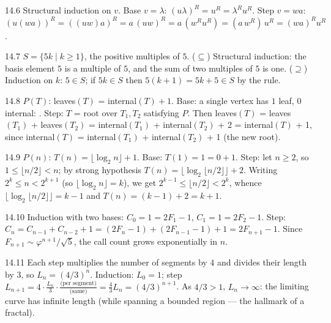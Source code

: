 \begin{solution}{14.6}
Structural induction on $v$. Base $v = \lambda$:
$(u\lambda)^R = u^R = \lambda^R u^R$. Step $v = wa$:
$(u(wa))^R = ((uw)a)^R = a\,(uw)^R = a\,(w^R u^R)
= (a\,w^R)\,u^R = (wa)^R u^R$.
\end{solution}

\begin{solution}{14.7}
$S = \{5k \mid k \geq 1\}$, the positive multiples of $5$. ($\subseteq$)
Structural induction: the basis element $5$ is a multiple of $5$, and the
sum of two multiples of $5$ is one. ($\supseteq$) Induction on $k$:
$5 \in S$; if $5k \in S$ then $5(k+1) = 5k + 5 \in S$ by the rule.
\end{solution}

\begin{solution}{14.8}
$P(T)$: leaves$(T)$ = internal$(T) + 1$. Base: a single vertex has $1$ leaf,
$0$ internal: \checkmark. Step: $T$ = root over $T_1, T_2$ satisfying $P$.
Then leaves$(T)$ = leaves$(T_1)$ + leaves$(T_2)$ =
internal$(T_1)$ + internal$(T_2)$ + 2 = internal$(T)$ + 1, since
internal$(T)$ = internal$(T_1)$ + internal$(T_2)$ + 1 (the new root).
\end{solution}

\begin{solution}{14.9}
$P(n)$: $T(n) = \lfloor \log_2 n \rfloor + 1$. Base: $T(1) = 1 = 0 + 1$.
Step: let $n \geq 2$, so $1 \le \lfloor n/2 \rfloor < n$; by strong
hypothesis $T(n) = \lfloor \log_2 \lfloor n/2 \rfloor \rfloor + 2$. Writing
$2^{k} \le n < 2^{k+1}$ (so $\lfloor\log_2 n\rfloor = k$), we get
$2^{k-1} \le \lfloor n/2 \rfloor < 2^{k}$, whence
$\lfloor \log_2 \lfloor n/2 \rfloor \rfloor = k - 1$ and
$T(n) = (k-1) + 2 = k + 1$. \checkmark
\end{solution}

\begin{solution}{14.10}
Induction with two bases: $C_0 = 1 = 2F_1 - 1$, $C_1 = 1 = 2F_2 - 1$.
Step:
$C_{n} = C_{n-1} + C_{n-2} + 1
= (2F_{n} - 1) + (2F_{n-1} - 1) + 1 = 2F_{n+1} - 1$.
Since $F_{n+1} \sim \varphi^{n+1}/\sqrt5$, the call count grows
exponentially in $n$.
\end{solution}

\begin{solution}{14.11}
Each step multiplies the number of segments by $4$ and divides their length
by $3$, so $L_{n} = (4/3)^{n}$. Induction: $L_0 = 1$; step
$L_{n+1} = 4 \cdot \frac{L_n}{3} \cdot \frac{\text{(per
segment)}}{\text{(same)}} = \tfrac43 L_n = (4/3)^{n+1}$. As
$4/3 > 1$, $L_n \to \infty$: the limiting curve has infinite length
(while spanning a bounded region --- the hallmark of a fractal).
\end{solution}

